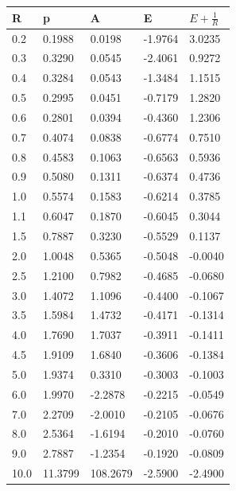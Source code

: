 {  
		\begin{tabular}{ m{6em} m{6em}  m{6em}  m{6em} m{6em} }
		\hline
		    R & p & A & E & $ E + \frac{1}{R} $ \\ \hline \hline
        0.2 & 0.1988 & 0.0198 & -1.9764 & 3.0235 \\
        0.3 & 0.3290 & 0.0545 & -2.4061 & 0.9272 \\
        0.4 & 0.3284 & 0.0543 & -1.3484 & 1.1515 \\
        0.5 & 0.2995 & 0.0451 & -0.7179 & 1.2820 \\
        0.6 & 0.2801 & 0.0394 & -0.4360 & 1.2306 \\
        0.7 & 0.4074 & 0.0838 & -0.6774 & 0.7510 \\
        0.8 & 0.4583 & 0.1063 & -0.6563 & 0.5936 \\
        0.9 & 0.5080 & 0.1311 & -0.6374 & 0.4736 \\
        1.0 & 0.5574 & 0.1583 & -0.6214 & 0.3785 \\
        1.1 & 0.6047 & 0.1870 & -0.6045 & 0.3044 \\
        1.5 & 0.7887 & 0.3230 & -0.5529 & 0.1137 \\
        2.0 & 1.0048 & 0.5365 & -0.5048 & -0.0040 \\
        2.5 & 1.2100 & 0.7982 & -0.4685 & -0.0680 \\
        3.0 & 1.4072 & 1.1096 & -0.4400 & -0.1067 \\
        3.5 & 1.5984 & 1.4732 & -0.4171 & -0.1314 \\
        4.0 & 1.7690 & 1.7037 & -0.3911 & -0.1411 \\
        4.5 & 1.9109 & 1.6840 & -0.3606 & -0.1384 \\
        5.0 & 1.9374 & 0.3310 & -0.3003 & -0.1003 \\
        6.0 & 1.9970 & -2.2878 & -0.2215 & -0.0549 \\
        7.0 & 2.2709 & -2.0010 & -0.2105 & -0.0676 \\
        8.0 & 2.5364 & -1.6194 & -0.2010 & -0.0760 \\
        9.0 & 2.7887 & -1.2354 & -0.1920 & -0.0809 \\
        10.0 & 11.3799 & 108.2679 & -2.5900 & -2.4900 \\
		\hline
		\end{tabular}
\restoregeometry
}

